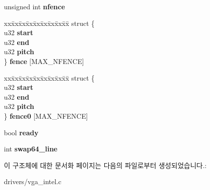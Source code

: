\begin{DoxyCompactItemize}
\item 
unsigned int {\bfseries nfence}\label{structvga__func__data_a0b4762a451ace362c83a76e15c7e3838}

\item 
\begin{tabbing}
xx\=xx\=xx\=xx\=xx\=xx\=xx\=xx\=xx\=\kill
struct \{\\
\>u32 {\bfseries start}\\
\>u32 {\bfseries end}\\
\>u32 {\bfseries pitch}\\
\} {\bfseries fence} [MAX\_NFENCE]\label{structvga__func__data_afc004afd8ce42d222797fddc0fb297b6}
\\

\end{tabbing}\item 
\begin{tabbing}
xx\=xx\=xx\=xx\=xx\=xx\=xx\=xx\=xx\=\kill
struct \{\\
\>u32 {\bfseries start}\\
\>u32 {\bfseries end}\\
\>u32 {\bfseries pitch}\\
\} {\bfseries fence0} [MAX\_NFENCE]\label{structvga__func__data_a7f5e032017c166441ad1c7a35550be13}
\\

\end{tabbing}\item 
bool {\bfseries ready}\label{structvga__func__data_aaba548bd872cbe640d03ebf21b7463fe}

\item 
int {\bfseries swap64\-\_\-line}\label{structvga__func__data_ad31b8168d0df24cdd5dbf5ecc83ec4ff}

\end{DoxyCompactItemize}


이 구조체에 대한 문서화 페이지는 다음의 파일로부터 생성되었습니다.\-:\begin{DoxyCompactItemize}
\item 
drivers/vga\-\_\-intel.\-c\end{DoxyCompactItemize}
